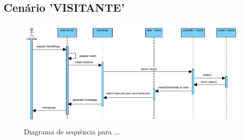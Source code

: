 \FloatBarrier\subsection{Cenário 'VISITANTE'}

\begin{figure}[!htb]
	\centering
	\includegraphics[width=\textwidth]{figuras/sequence_diagram_visitante.png}
	\caption{Diagrama de sequência para ...}
	\label{fig:sequência_visitante}
\end{figure}